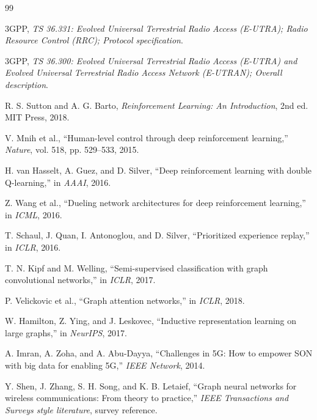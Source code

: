 \documentclass[12pt,a4paper]{report}
\begin{document}
\begin{thebibliography}{99}

3GPP, \emph{TS 36.331: Evolved Universal Terrestrial Radio Access (E-UTRA); Radio Resource Control (RRC); Protocol specification}.

3GPP, \emph{TS 36.300: Evolved Universal Terrestrial Radio Access (E-UTRA) and Evolved Universal Terrestrial Radio Access Network (E-UTRAN); Overall description}.

R. S. Sutton and A. G. Barto, \emph{Reinforcement Learning: An Introduction}, 2nd ed. MIT Press, 2018.

V. Mnih et al., ``Human-level control through deep reinforcement learning,'' \emph{Nature}, vol. 518, pp. 529--533, 2015.

H. van Hasselt, A. Guez, and D. Silver, ``Deep reinforcement learning with double Q-learning,'' in \emph{AAAI}, 2016.

Z. Wang et al., ``Dueling network architectures for deep reinforcement learning,'' in \emph{ICML}, 2016.

T. Schaul, J. Quan, I. Antonoglou, and D. Silver, ``Prioritized experience replay,'' in \emph{ICLR}, 2016.

T. N. Kipf and M. Welling, ``Semi-supervised classification with graph convolutional networks,'' in \emph{ICLR}, 2017.

P. Velickovic et al., ``Graph attention networks,'' in \emph{ICLR}, 2018.

W. Hamilton, Z. Ying, and J. Leskovec, ``Inductive representation learning on large graphs,'' in \emph{NeurIPS}, 2017.

A. Imran, A. Zoha, and A. Abu-Dayya, ``Challenges in 5G: How to empower SON with big data for enabling 5G,'' \emph{IEEE Network}, 2014.

Y. Shen, J. Zhang, S. H. Song, and K. B. Letaief, ``Graph neural networks for wireless communications: From theory to practice,'' \emph{IEEE Transactions and Surveys style literature}, survey reference.

\end{thebibliography}
\end{document}

